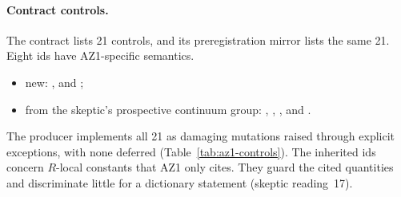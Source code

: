 \paragraph{Contract controls.}
The contract lists 21 controls, and its preregistration mirror lists the same
21. Eight ids have AZ1-specific semantics.
\begin{itemize}\raggedright
\item new: ,
  and
 ;
\item from the skeptic's prospective continuum group:
 , ,
 ,  and
 .
\end{itemize}
The producer implements all 21 as damaging mutations raised through explicit
exceptions, with none deferred (Table~\ref{tab:az1-controls}). The inherited
ids concern $R$-local constants that AZ1 only cites. They guard the cited
quantities and discriminate little for a dictionary statement (skeptic
reading~17).

